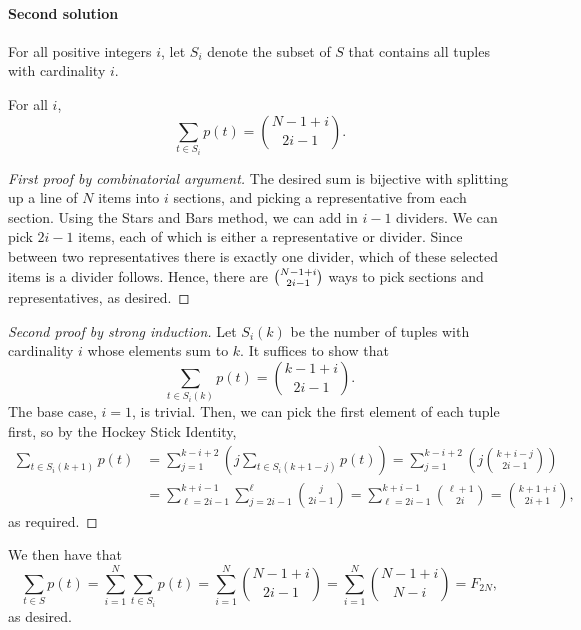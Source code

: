 \paragraph{Second solution}     For all positive integers $i$, let $S_i$ denote the subset of $S$ that contains all tuples with cardinality $i$.
    \begin{claim*}
        For all $i$, \[\sum_{t\in S_i}p(t)=\binom{N-1+i}{2i-1}.\]
    \end{claim*}
    \begin{proof}[First proof by combinatorial argument]
        The desired sum is bijective with splitting up a line of $N$ items into $i$ sections, and picking a representative from each section. Using the Stars and Bars method, we can add in $i-1$ dividers. We can pick $2i-1$ items, each of which is either a representative or divider. Since between two representatives there is exactly one divider, which of these selected items is a divider follows. Hence, there are $\tbinom{N-1+i}{2i-1}$ ways to pick sections and representatives, as desired.
    \end{proof}
    \begin{proof}[Second proof by strong induction]
        Let $S_i(k)$ be the number of tuples with cardinality $i$ whose elements sum to $k$. It suffices to show that \[\sum_{t\in S_i(k)}p(t)=\binom{k-1+i}{2i-1}.\]
        The base case, $i=1$, is trivial. Then, we can pick the first element of each tuple first, so by the Hockey Stick Identity,
        \begin{align*}
            \sum_{t\in S_i(k+1)}p(t)&=\sum_{j=1}^{k-i+2}\left(j\sum_{t\in S_i(k+1-j)}p(t)\right)=\sum_{j=1}^{k-i+2}\left(j\binom{k+i-j}{2i-1}\right)\\
            &=\sum_{\ell=2i-1}^{k+i-1}\sum_{j=2i-1}^\ell\binom{j}{2i-1}=\sum_{\ell=2i-1}^{k+i-1}\binom{\ell+1}{2i}=\binom{k+1+i}{2i+1},
        \end{align*}
        as required.
    \end{proof}

    We then have that
    \[\sum_{t\in S}p(t)=\sum_{i=1}^{N}\sum_{t\in S_i}p(t)=\sum_{i=1}^{N}\binom{N-1+i}{2i-1}=\sum_{i=1}^{N}\binom{N-1+i}{N-i}=F_{2N},\]
    as desired.

